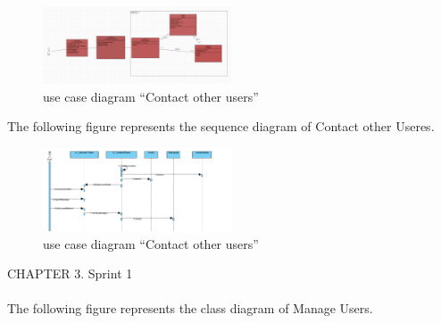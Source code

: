 \documentclass{article}
\begin{document}
{{{{{{{{\begin{figure}[htbp]
    \centering
    \includegraphics[width=0.5\textwidth]{DiagContact}
    \caption{use case diagram “Contact other users”}
    \label{fig:design2}
\end{figure}
The following figure represents the sequence diagram of Contact other Useres.\\
\begin{figure}[htbp]
    \centering
    \includegraphics[width=0.5\textwidth]{DiagContactSeq}
    \caption{use case diagram “Contact other users”}
    \label{fig:design2}
\end{figure}
\newpage
\noindent
CHAPTER 3.  Sprint 1 \\
\underline{\hspace{\textwidth}} \vspace{0.2cm}\\
The following figure represents the class diagram of Manage Users.\\

}}}}}}}}
\end{document}
